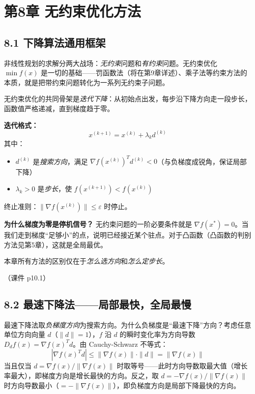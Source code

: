 \section{第8章 \quad 无约束优化方法}

\subsection{8.1 下降算法通用框架}

非线性规划的求解分两大战场：\emph{无约束}问题和\emph{有约束}问题。无约束优化 $\min f(x)$ 是一切的基础——罚函数法（将在第9章详述）、乘子法等约束方法的本质，就是把带约束问题转化为一系列无约束子问题。

无约束优化的共同骨架是\emph{迭代下降}：从初始点出发，每步沿下降方向走一段步长，函数值严格递减，直到梯度趋于零。

\textbf{迭代格式：}
\[
x^{(k+1)} = x^{(k)} + \lambda_k d^{(k)}
\]
其中：
\begin{itemize}
  \item $d^{(k)}$ 是\emph{搜索方向}，满足 $\nabla f(x^{(k)})^T d^{(k)} < 0$（与负梯度成锐角，保证局部下降）
  \item $\lambda_k > 0$ 是\emph{步长}，使 $f(x^{(k+1)}) < f(x^{(k)})$
\end{itemize}
终止准则：$\|\nabla f(x^{(k)})\| \le \varepsilon$ 时停止。

\textbf{为什么梯度为零是停机信号？} 无约束问题的一阶必要条件就是 $\nabla f(x^*) = 0$。当我们走到梯度“足够小”的点，说明已经接近某个驻点。对于凸函数（凸函数的判别方法见第5章），这就是全局最优。

本章所有方法的区别仅在于\emph{怎么选方向}和\emph{怎么定步长}。

（课件 p10.1）

\subsection{8.2 最速下降法——局部最快，全局最慢}

最速下降法取\emph{负梯度方向}为搜索方向。为什么负梯度是“最速下降”方向？考虑任意单位方向向量 $d$（$\|d\|=1$），$f$ 沿 $d$ 的瞬时变化率为方向导数 $D_d f(x)=\nabla f(x)^T d$。由 Cauchy-Schwarz 不等式：
\[
|\nabla f(x)^T d| \le \|\nabla f(x)\| \cdot \|d\| = \|\nabla f(x)\|
\]
当且仅当 $d = \nabla f(x)/\|\nabla f(x)\|$ 时取等号——此时方向导数取最大值（增长率最大），即梯度方向是增长最快的方向。反之，取 $d = -\nabla f(x)/\|\nabla f(x)\|$ 时方向导数最小（$= -\|\nabla f(x)\|$），即负梯度方向是局部下降最快的方向。

